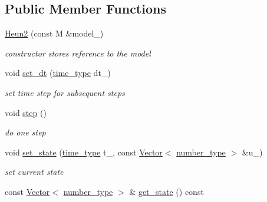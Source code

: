 \subsection*{Public Member Functions}
\begin{DoxyCompactItemize}
\item 
\hypertarget{classhdnum_1_1Heun2_aeddfa6a0a287892a6008da5c95d13dd7}{
\hyperlink{classhdnum_1_1Heun2_aeddfa6a0a287892a6008da5c95d13dd7}{Heun2} (const M \&model\_\-)}
\label{classhdnum_1_1Heun2_aeddfa6a0a287892a6008da5c95d13dd7}

\begin{DoxyCompactList}\small\item\em constructor stores reference to the model \item\end{DoxyCompactList}\item 
\hypertarget{classhdnum_1_1Heun2_a4998cbb9dc1e4aa127a2209a5d5cb69c}{
void \hyperlink{classhdnum_1_1Heun2_a4998cbb9dc1e4aa127a2209a5d5cb69c}{set\_\-dt} (\hyperlink{classhdnum_1_1Heun2_ac2e59a8551ffbce1455c0fd5266965fd}{time\_\-type} dt\_\-)}
\label{classhdnum_1_1Heun2_a4998cbb9dc1e4aa127a2209a5d5cb69c}

\begin{DoxyCompactList}\small\item\em set time step for subsequent steps \item\end{DoxyCompactList}\item 
\hypertarget{classhdnum_1_1Heun2_a967c7c1e842f5400d568ebf0b7c92877}{
void \hyperlink{classhdnum_1_1Heun2_a967c7c1e842f5400d568ebf0b7c92877}{step} ()}
\label{classhdnum_1_1Heun2_a967c7c1e842f5400d568ebf0b7c92877}

\begin{DoxyCompactList}\small\item\em do one step \item\end{DoxyCompactList}\item 
\hypertarget{classhdnum_1_1Heun2_ad5f075aa349590dbfb2e99fc565dadfc}{
void \hyperlink{classhdnum_1_1Heun2_ad5f075aa349590dbfb2e99fc565dadfc}{set\_\-state} (\hyperlink{classhdnum_1_1Heun2_ac2e59a8551ffbce1455c0fd5266965fd}{time\_\-type} t\_\-, const \hyperlink{classhdnum_1_1Vector}{Vector}$<$ \hyperlink{classhdnum_1_1Heun2_af16dadf05575fe6ec2c0602fedfe8d2b}{number\_\-type} $>$ \&u\_\-)}
\label{classhdnum_1_1Heun2_ad5f075aa349590dbfb2e99fc565dadfc}

\begin{DoxyCompactList}\small\item\em set current state \item\end{DoxyCompactList}\item 
\hypertarget{classhdnum_1_1Heun2_ad14ab9cd78584ada47e543820bb73b78}{
const \hyperlink{classhdnum_1_1Vector}{Vector}$<$ \hyperlink{classhdnum_1_1Heun2_af16dadf05575fe6ec2c0602fedfe8d2b}{number\_\-type} $>$ \& \hyperlink{classhdnum_1_1Heun2_ad14ab9cd78584ada47e543820bb73b78}{get\_\-state} () const }
\label{classhdnum_1_1Heun2_ad14ab9cd78584ada47e543820bb73b78}


\end{DoxyCompactItemize}
